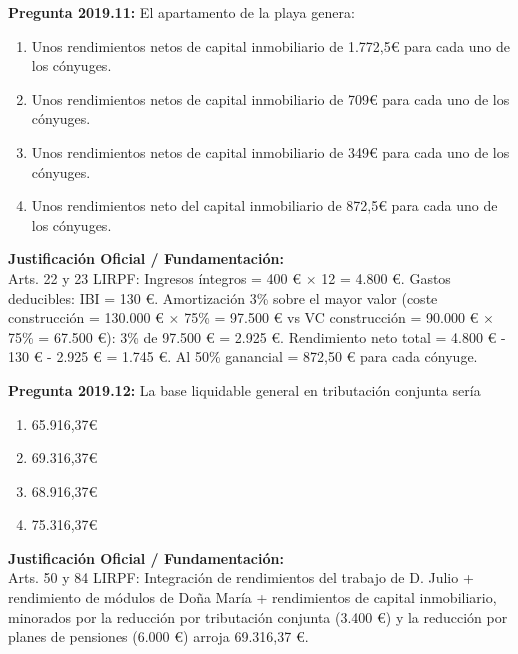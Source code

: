 \documentclass[11pt,a4paper,openany]{article}
\begin{document}
\noindent\textbf{\sffamily Pregunta 2019.11:} El apartamento de la playa genera:\\[0.15cm]
\begin{enumerate}[label=\textbf{\alph*)},leftmargin=1.8em,itemsep=1.5pt,topsep=2pt,partopsep=0pt,parsep=0pt]
    \item Unos rendimientos netos de capital inmobiliario de 1.772,5\euro{} para cada uno de los cónyuges.
    \item Unos rendimientos netos de capital inmobiliario de 709\euro{} para cada uno de los cónyuges.
    \item Unos rendimientos netos de capital inmobiliario de 349\euro{} para cada uno de los cónyuges.
    \item Unos rendimientos neto del capital inmobiliario de 872,5\euro{} para cada uno de los cónyuges.
\end{enumerate}
\begin{solucionBox}
\textbf{Justificación Oficial / Fundamentación:}\\[0.1cm]
Arts. 22 y 23 LIRPF: Ingresos íntegros = 400 \euro{} $\times$  12 = 4.800 \euro{}. Gastos deducibles: IBI = 130 \euro{}. Amortización 3\% sobre el mayor valor (coste construcción = 130.000 \euro{} $\times$  75\% = 97.500 \euro{} vs VC construcción = 90.000 \euro{} $\times$  75\% = 67.500 \euro{}): 3\% de 97.500 \euro{} = 2.925 \euro{}. Rendimiento neto total = 4.800 \euro{} - 130 \euro{} - 2.925 \euro{} = 1.745 \euro{}. Al 50\% ganancial = 872,50 \euro{} para cada cónyuge.
\end{solucionBox}
\vspace{0.35cm}

\noindent\textbf{\sffamily Pregunta 2019.12:} La base liquidable general en tributación conjunta sería\\[0.15cm]
\begin{enumerate}[label=\textbf{\alph*)},leftmargin=1.8em,itemsep=1.5pt,topsep=2pt,partopsep=0pt,parsep=0pt]
    \item 65.916,37\euro{}
    \item 69.316,37\euro{}
    \item 68.916,37\euro{}
    \item 75.316,37\euro{}
\end{enumerate}
\begin{solucionBox}
\textbf{Justificación Oficial / Fundamentación:}\\[0.1cm]
Arts. 50 y 84 LIRPF: Integración de rendimientos del trabajo de D. Julio + rendimiento de módulos de Doña María + rendimientos de capital inmobiliario, minorados por la reducción por tributación conjunta (3.400 \euro{}) y la reducción por planes de pensiones (6.000 \euro{}) arroja 69.316,37 \euro{}.
\end{solucionBox}
\vspace{0.35cm}
\end{document}
